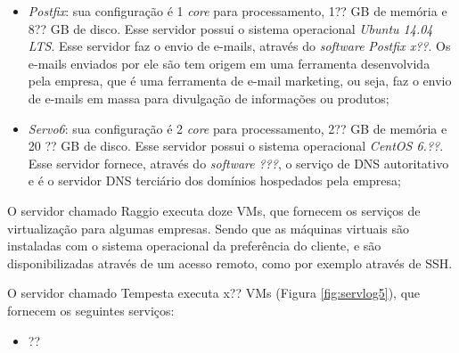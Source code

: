 \begin{itemize}
 \item \textit{Postfix}: sua configuração é 1 \textit{core} para processamento, 1?? GB de memória e 8?? GB de disco. Esse servidor possui o 
 sistema operacional \textit{Ubuntu 14.04 \ac{LTS}}. Esse servidor faz o envio de e-mails, através do \textit{software} \textit{Postfix x??}.
 Os e-mails enviados por ele são tem origem em uma ferramenta desenvolvida pela empresa, que é uma ferramenta de e-mail marketing, ou seja, 
 faz o envio de e-mails em massa para divulgação de informações ou produtos;
 
 \item \textit{Servo6}: sua configuração é 2 \textit{core} para processamento, 2?? GB de memória e 20 ?? GB de disco. Esse servidor possui o 
 sistema operacional \textit{CentOS 6.??}. Esse servidor fornece, através do \textit{software} \textit{???}, o serviço de \ac{DNS} autoritativo 
 e é o servidor \ac{DNS} terciário dos domínios hospedados pela empresa;
\end{itemize}

O servidor chamado Raggio executa doze \ac{VM}s, que fornecem os serviços de virtualização para algumas empresas. Sendo que as máquinas virtuais
são instaladas com o sistema operacional da preferência do cliente, e são disponibilizadas através de um acesso remoto, como por exemplo através
de \ac{SSH}.

O servidor chamado Tempesta executa x?? \ac{VM}s (Figura \ref{fig:servlog5}), que fornecem os seguintes serviços:
\begin{itemize}
 \item ??
\end{itemize}

